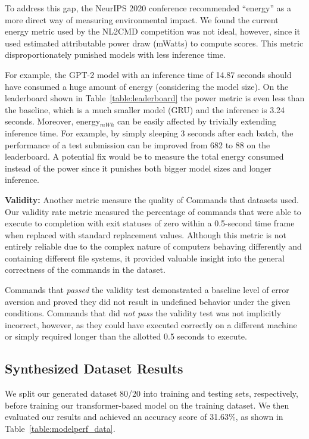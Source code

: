 \documentclass{river-journal}
\begin{document}
To address this gap, the NeurIPS 2020 conference recommended ``energy'' as a more direct way of measuring environmental impact.	We found the current energy metric used by the NL2CMD competition was not ideal, however, since it used estimated attributable power draw (mWatts) to compute scores. This metric disproportionately punished models with less inference time.	

For example, the GPT-2 model with an inference time of 14.87 seconds should have consumed a huge amount of energy (considering the model size). On the leaderboard shown in Table~\ref{table:leaderboard} the power metric is even less than the baseline, which is a much smaller model (GRU) and the inference is 3.24 seconds. Moreover, energy$_{mWh}$ can be easily affected by trivially extending inference time. For example, by simply sleeping 3 seconds after each batch, the performance of a test submission can be improved from 682 to 88 on the leaderboard. A potential fix would be to measure the total energy consumed instead of the power since it punishes both bigger model sizes and longer inference. 

\textbf{Validity:} Another metric measure the quality of Commands that datasets used. Our validity rate metric measured the percentage of commands that were able to execute to completion with exit statuses of zero within a 0.5-second time frame when replaced with standard replacement values. Although this metric is not entirely reliable due to the complex nature of computers behaving differently and containing different file systems, it provided valuable insight into the general correctness of the commands in the dataset. 

Commands that {\em passed} the validity test demonstrated a baseline level of error aversion and proved they did not result in undefined behavior under the given conditions. Commands that did {\em not pass} the validity test was not implicitly incorrect, however, as they could have executed correctly on a different machine or simply required longer than the allotted 0.5 seconds to execute. 

\subsection{Synthesized Dataset Results}
\label{section.result}

We split our generated dataset 80/20 into training and testing sets, respectively, before training our transformer-based model on the training dataset. We then evaluated our results and achieved an accuracy score of 31.63\%, as shown in Table~\ref{table:modelperf_data}. 
\end{document}
